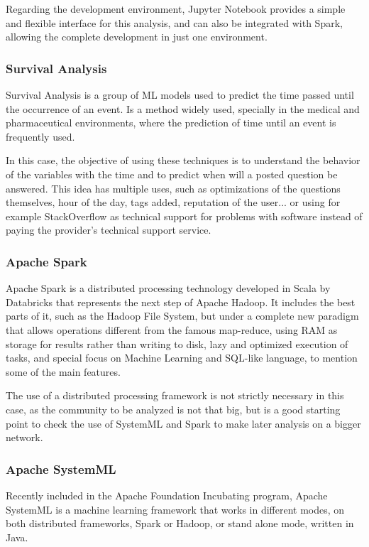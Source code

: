\documentclass[11pt]{article} %
\begin{document}
    Regarding the development environment, Jupyter Notebook provides a simple and flexible interface for this analysis, and can also be integrated with Spark, allowing the complete development in just one environment.

  \subsubsection{Survival Analysis}

    Survival Analysis is a group of ML models used to predict the time passed until the occurrence of an event. Is a method widely used, specially in the medical and pharmaceutical environments, where the prediction of time until an event is frequently used.

    In this case, the objective of using these techniques is to understand the behavior of the variables with the time and to predict when will a posted question be answered. This idea has multiple uses, such as optimizations of the questions themselves, hour of the day, tags added, reputation of the user... or using for example StackOverflow as technical support for problems with software instead of paying the provider's technical support service.

  \subsubsection{Apache Spark}

    Apache Spark is a distributed processing technology developed in Scala by Databricks that represents the next step of Apache Hadoop. It includes the best parts of it, such as the Hadoop File System, but under a complete new paradigm that allows operations different from the famous map-reduce, using RAM as storage for results rather than writing to disk, lazy and optimized execution of tasks, and special focus on Machine Learning and SQL-like language, to mention some of the main features.

    The use of a distributed processing framework is not strictly necessary in this case, as the community to be analyzed is not that big, but is a good starting point to check the use of SystemML and Spark to make later analysis on a bigger network.

  \subsubsection{Apache SystemML}

    Recently included in the Apache Foundation Incubating  program, Apache SystemML is a machine learning framework that works in different modes, on both distributed frameworks, Spark or Hadoop, or stand alone mode, written in Java.
\end{document}
